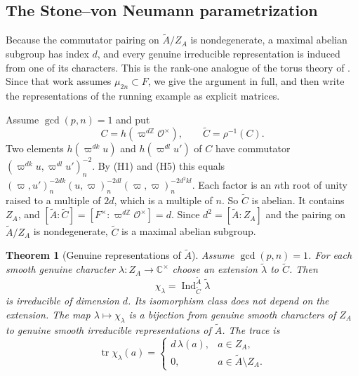 \documentclass[12pt,letterpaper]{article}
\numberwithin{equation}{section}
\theoremstyle{plain}
\newtheorem{theorem}{Theorem}[section]
\theoremstyle{definition}
\theoremstyle{remark}
\newcommand{\At}{\widetilde A}
\newcommand{\Ct}{\widetilde C}
\newcommand{\Cc}{\mathbb C}
\newcommand{\Zz}{\mathbb Z}
\newcommand{\Of}{\mathcal O}
\newcommand{\ZA}{Z_A}
\DeclareMathOperator{\Ind}{Ind}
\DeclareMathOperator{\tr}{tr}
\begin{document}
\subsection{The Stone--von Neumann parametrization}\label{subsec:svn}

Because the commutator pairing on $\At/\ZA$ is nondegenerate, a maximal
abelian subgroup has index $d$, and every genuine irreducible
representation is induced from one of its characters. This is the
rank-one analogue of the torus theory of \cite{Mc12}. Since that work
assumes $\mu_{2n}\subset F$, we give the argument in full, and then
write the representations of the running example as explicit matrices.

Assume $\gcd(p,n)=1$ and put
\[
C=h(\varpi^{d\Zz}\Of^\times),\qquad \Ct=\rho^{-1}(C).
\]
Two elements $h(\varpi^{dk}u)$ and $h(\varpi^{dl}u')$ of $C$ have
commutator $(\varpi^{dk}u,\varpi^{dl}u')_n^{-2}$. By (H1) and (H5) this
equals $(\varpi,u')_n^{-2dk}(u,\varpi)_n^{-2dl}(\varpi,\varpi)_n^{-2d^2kl}$.
Each factor is an $n$th root of unity raised to a multiple of $2d$,
which is a multiple of $n$. So $\Ct$ is abelian. It contains $\ZA$, and
$[\At:\Ct]=[F^\times:\varpi^{d\Zz}\Of^\times]=d$. Since $d^2=[\At:\ZA]$
and the pairing on $\At/\ZA$ is nondegenerate, $\Ct$ is a maximal
abelian subgroup.

\begin{theorem}[Genuine representations of $\At$]\label{thm:torus}
Assume $\gcd(p,n)=1$. For each smooth genuine character
$\lambda:\ZA\to\Cc^\times$ choose an extension $\tilde\lambda$ to
$\Ct$. Then
\begin{equation}\label{eq:stone}
\chi_\lambda=\Ind_{\Ct}^{\At}\tilde\lambda
\end{equation}
is irreducible of dimension $d$. Its isomorphism class does not depend
on the extension. The map $\lambda\mapsto\chi_\lambda$ is a bijection
from genuine smooth characters of $\ZA$ to genuine smooth irreducible
representations of $\At$. The trace is
\begin{equation}\label{eq:torus-trace}
\tr\chi_\lambda(a)=
\begin{cases}
d\,\lambda(a),&a\in\ZA,\\
0,&a\in\At\setminus\ZA.
\end{cases}
\end{equation}
\end{theorem}
\end{document}
